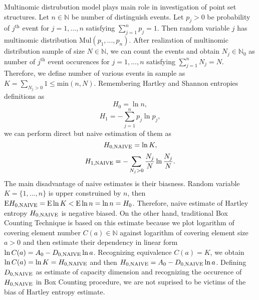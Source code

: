 \documentclass[a4paper,10pt]{article}
\begin{document}
Multinomic distrubution model plays main role in investigation of point set structures. Let $n \in \mathbb{N}$ be number of distinguish events. Let $p_{j} > 0$ be probability of $j^{\text{th}}$ event for $j = 1,...,n$ satisfying $ \sum_{j=1}^{n} p_{j} =1$. Then random variable $j$ has multinomic distribution $\text{Mul}(p_{1},...,p_{n})$. After realization of multinomic distribution sample of size $N \in \mathbb{N}$, we can count the events and obtain $N_{j} \in \mathbb{N}_{0}$ as number of $j^{\text{th}}$ event occurences for $j=1,...,n$ satisfying $\sum_{j=1}^{n} N_{j} = N$. Therefore, we define number of various events in sample as $K = \sum_{N_{j}>0} 1 \le \text{min}(n,N)$. Remembering Hartley and Shannon entropies definitions as
\begin{equation} 
\label{eq:hnula}
H_{0}=\ln{n},
\end{equation} 
\begin{equation} 
\label{eq:hjedna}
H_{1}=-\sum_{j=1}^{n} p_{j}\ln{p_{j}},
\end{equation}   
we can perform direct but naive estimation of them as
\begin{equation} 
\label{eq:hnula}
H_{0,\mbox{\scriptsize{NAIVE}}}=\ln{K},
\end{equation} 
\begin{equation} 
\label{eq:hjedna}
H_{1,\mbox{\scriptsize{NAIVE}}}=-\sum_{N_{j}>0} \frac{N_{j}}{N}\ln{\frac{N_{j}}{N}}.
\end{equation}   
The main disadvantage of naive estimates is their biasness. Random variable $K= \{ 1,...,n \} $ is upper construined by $n$, then $\text{E}H_{0,\mbox{\scriptsize{NAIVE}}} = \text{E}\ln{K} < \text{E}\ln{n} = \ln{n} = H_{0}$. Therefore, naive estimate of Hartley entropy $H_{0,\mbox{\scriptsize{NAIVE}}}$ is negative biased. On the other hand, traditional Box Counting Technique is based on this estimate because we plot logarithm of covering element number $C(a) \in \mathbb{N}$ against logarithm of covering element size $a > 0$ and then estimate their dependency in linear form $\ln{C(a)} = A_{0} - D_{0,\mbox{\scriptsize{NAIVE}}}\ln{a}$. Recognizing equivalence $C(a) = K$, we obtain $\ln{C(a)} = \ln{K} = H_{0,\mbox{\scriptsize{NAIVE}}}$ and then $H_{0,\mbox{\scriptsize{NAIVE}}} = A_{0} - D_{0,\mbox{\scriptsize{NAIVE}}}\ln{a}$. Defining $D_{0,\mbox{\scriptsize{NAIVE}}}$ as estimate of capacity dimension and recognizing the occurence of $H_{0,\mbox{\scriptsize{NAIVE}}}$ in Box Counting procedure, we are not suprised to be victims of the bias of Hartley entropy estimate.\\ 
\end{document}
